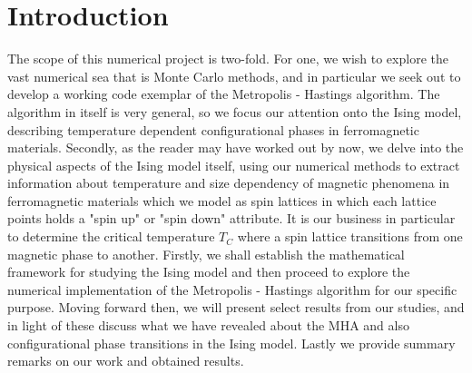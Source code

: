 \section{Introduction}
The scope of this numerical project is two-fold. For one, we wish to explore the vast numerical sea that is Monte Carlo methods, and in particular we seek out to develop a working code exemplar of the Metropolis - Hastings algorithm. The algorithm in itself is very general, so we focus our attention onto the Ising model, describing temperature dependent configurational phases in ferromagnetic materials. Secondly, as the reader may have worked out by now, we delve into the physical aspects of the Ising model itself, using our numerical methods to extract information about temperature and size dependency of magnetic phenomena in ferromagnetic materials which we model as spin lattices in which each lattice points holds a "spin up" or "spin down" attribute. It is our business in particular to determine the critical temperature $T_C$ where a spin lattice transitions from one magnetic phase to another. Firstly, we shall establish the mathematical framework for studying the Ising model and then proceed to explore the numerical implementation of the Metropolis - Hastings algorithm for our specific purpose. Moving forward then, we will present select results from our studies, and in light of these discuss what we have revealed about the MHA and also configurational phase transitions in the Ising model. Lastly we provide summary remarks on our work and obtained results. 